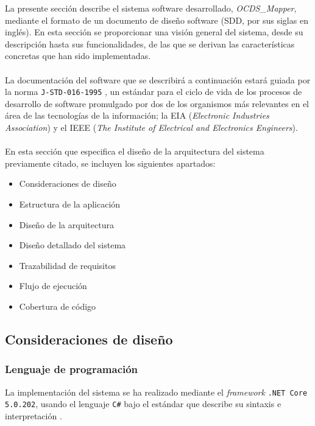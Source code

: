  \label{sec:software}
    La presente sección describe el sistema software desarrollado, \textit{OCDS\_Mapper}, mediante el formato de un documento de diseño software (SDD, por sus siglas en inglés). En esta sección se proporcionar una visión general del sistema, desde su descripción hasta sus funcionalidades, de las que se derivan las características concretas que han sido implementadas.
    \\ \\
    La documentación del software que se describirá a continuación estará guiada por la norma \texttt{J-STD-016-1995} \cite{JSTD}, un estándar para el ciclo de vida de los procesos de desarrollo de software promulgado por dos de los organismos más relevantes en el área de las tecnologías de la información; la EIA (\textit{Electronic Industries Association}) y el IEEE (\textit{The Institute of Electrical and Electronics Engineers}).
    \\ \\
    En esta sección que especifica el diseño de la arquitectura del sistema previamente citado, se incluyen los siguientes apartados:
    \\
    \begin{itemize}
        \item Consideraciones de diseño
        \item Estructura de la aplicación
        \item Diseño de la arquitectura
        \item Diseño detallado del sistema
        \item Trazabilidad de requisitos
        \item Flujo de ejecución
        \item Cobertura de código
    \end{itemize}
    
    \subsection{Consideraciones de diseño}
        \subsubsection{Lenguaje de programación}
            La implementación del sistema se ha realizado mediante el \textit{framework} \texttt{.NET Core 5.0.202}, usando el lenguaje \texttt{C\#} bajo el estándar que describe su sintaxis e interpretación \cite{ISOCS}.
            
